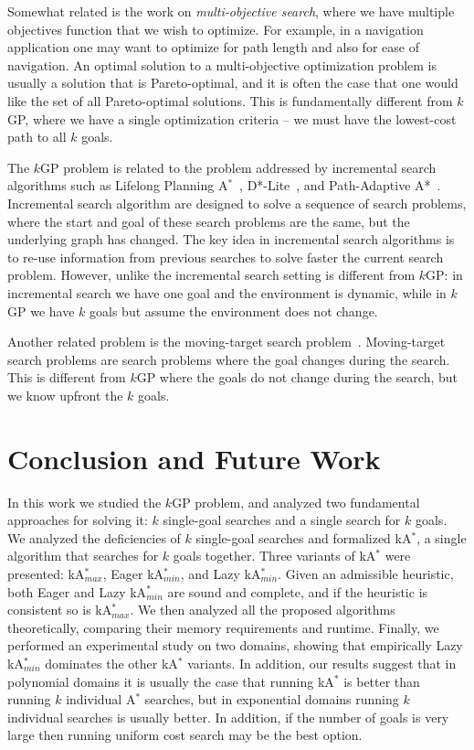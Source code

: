 \documentclass{aicom2e}
\newcommand{\kgs}{$k$GP}
\newcommand{\astar}{A$^*$}
\newcommand{\kastar}{kA$^*$}
\newcommand{\kastarmin}{kA$^*_{min}$}
\newcommand{\kastarmax}{kA$^*_{max}$}
\begin{document}
Somewhat related is the work on {\em multi-objective search}, where we have multiple objectives function that we wish to optimize. For example, in a navigation application one may want to optimize for path length and also for ease of navigation. An optimal solution to a multi-objective optimization problem is usually a solution that is Pareto-optimal, and it is often the case that one would like the set of all Pareto-optimal solutions. This is fundamentally different from \kgs{}, where we have a single optimization criteria -- we must have the lowest-cost path to all $k$ goals.


The \kgs{} problem is related to the problem addressed by incremental search algorithms such as Lifelong Planning \astar{}~\cite{koenig2004lifelong},  D*-Lite~\cite{koenig2005fast}, and Path-Adaptive A*~\cite{hernandez2015reusing}. Incremental search algorithm are designed to solve a sequence of search problems, where the start and goal of these search problems are the same, but the underlying graph has changed. The key idea in incremental search algorithms is to re-use information from previous searches to solve faster the current search problem. However, unlike the incremental search setting is different from \kgs{}: in incremental search we have one goal and the environment is dynamic, while in \kgs{} we have $k$ goals but assume the environment does not change.

Another related problem is the moving-target search problem~\cite{koenig2007speeding,ishida1991moving}. Moving-target search problems are search problems where the goal changes during the search. This is different from \kgs{} where the goals do not change during the search, but we know upfront the $k$ goals.


\section{Conclusion and Future Work}
In this work we studied the \kgs{} problem, and analyzed two fundamental approaches for solving it: $k$ single-goal searches and a single search for $k$ goals. We analyzed the deficiencies of $k$ single-goal searches and formalized \kastar{}, a single algorithm that searches for $k$ goals together.
Three variants of \kastar{} were presented: \kastarmax{}, Eager \kastarmin{}, and Lazy \kastarmin{}. Given an admissible heuristic, both Eager and Lazy \kastarmin{} are sound and complete, and if the heuristic is consistent so is \kastarmax{}. We then analyzed all the proposed algorithms theoretically, comparing their memory requirements and runtime. Finally, we performed an experimental study on two domains, showing that empirically Lazy \kastarmin{} dominates the other \kastar{} variants. In addition, our results suggest that
in polynomial domains it is usually the case that running \kastar{} is better than running $k$ individual \astar{} searches, but in exponential domains running $k$ individual searches is usually better. In addition, if the number of goals is very large then running uniform cost search may be the best option.
\end{document}
